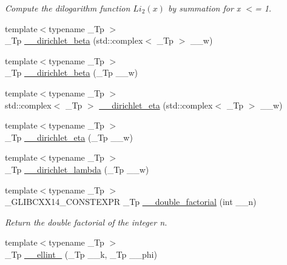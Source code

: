 \begin{DoxyCompactItemize}
\begin{DoxyCompactList}\small\item\em Compute the dilogarithm function $ Li_2(x) $ by summation for x $<$= 1. \end{DoxyCompactList}\item 
{\footnotesize template$<$typename \+\_\+\+Tp $>$ }\\\+\_\+\+Tp \hyperlink{namespacestd_1_1____detail_ae2e1407cd73ed7ca37c9085971d64787}{\+\_\+\+\_\+dirichlet\+\_\+beta} (std\+::complex$<$ \+\_\+\+Tp $>$ \+\_\+\+\_\+w)
\item 
{\footnotesize template$<$typename \+\_\+\+Tp $>$ }\\\+\_\+\+Tp \hyperlink{namespacestd_1_1____detail_a6cedea78253fd4d6da481c681a2eed72}{\+\_\+\+\_\+dirichlet\+\_\+beta} (\+\_\+\+Tp \+\_\+\+\_\+w)
\item 
{\footnotesize template$<$typename \+\_\+\+Tp $>$ }\\std\+::complex$<$ \+\_\+\+Tp $>$ \hyperlink{namespacestd_1_1____detail_ac00ca43b3035da757d982b43d2c59bc1}{\+\_\+\+\_\+dirichlet\+\_\+eta} (std\+::complex$<$ \+\_\+\+Tp $>$ \+\_\+\+\_\+w)
\item 
{\footnotesize template$<$typename \+\_\+\+Tp $>$ }\\\+\_\+\+Tp \hyperlink{namespacestd_1_1____detail_acd1e2a576d04658c6332df91cdaacd6e}{\+\_\+\+\_\+dirichlet\+\_\+eta} (\+\_\+\+Tp \+\_\+\+\_\+w)
\item 
{\footnotesize template$<$typename \+\_\+\+Tp $>$ }\\\+\_\+\+Tp \hyperlink{namespacestd_1_1____detail_a9f006b5bca9aada788bb88bdbaa2c0ba}{\+\_\+\+\_\+dirichlet\+\_\+lambda} (\+\_\+\+Tp \+\_\+\+\_\+w)
\item 
{\footnotesize template$<$typename \+\_\+\+Tp $>$ }\\\+\_\+\+G\+L\+I\+B\+C\+X\+X14\+\_\+\+C\+O\+N\+S\+T\+E\+X\+PR \+\_\+\+Tp \hyperlink{namespacestd_1_1____detail_a06b0d9786afff0919c96f61d5f760c5f}{\+\_\+\+\_\+double\+\_\+factorial} (int \+\_\+\+\_\+n)
\begin{DoxyCompactList}\small\item\em Return the double factorial of the integer n. \end{DoxyCompactList}\item 
{\footnotesize template$<$typename \+\_\+\+Tp $>$ }\\\+\_\+\+Tp \hyperlink{namespacestd_1_1____detail_aa349fe5bcf36d29cfacf6cd3e8aa65b0}{\+\_\+\+\_\+ellint\+\_} (\+\_\+\+Tp \+\_\+\+\_\+k, \+\_\+\+Tp \+\_\+\+\_\+phi)

\end{DoxyCompactItemize}
